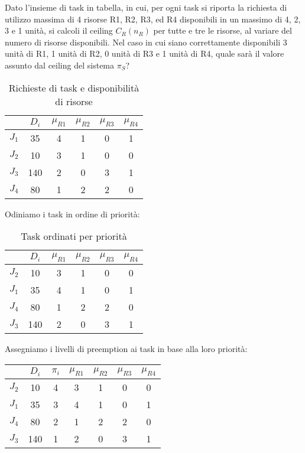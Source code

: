 \begin{Esercizio3}

Dato l'insieme di task in tabella, in cui, 
per ogni task si riporta la richiesta
 di utilizzo massima di 4 risorse R1, R2, R3, ed 
 R4 disponibili in un massimo di 4, 2, 3 e 1 unità, 
 si calcoli il ceiling \(C_{R}(n_{R})\) per tutte e tre le risorse, 
 al variare del numero di risorse disponibili. 
 Nel caso in cui siano correttamente disponibili 3
  unità di R1, 1 unità di R2, 0 unità di R3 e 1 
  unità di R4, quale sarà il valore assunto dal 
  ceiling del sistema \(\pi_{S}\)?

  \begin{table}[H]
\centering
\begin{tabular}{|c|c|c|c|c|c|}
\hline
& $D_i$ & $\mu_{R1}$ & $\mu_{R2}$ & $\mu_{R3}$ & $\mu_{R4}$ \\
\hline
$J_1$ & 35 & 4 & 1 & 0 & 1 \\
\hline
$J_2$ & 10 & 3 & 1 & 0 & 0 \\
\hline
$J_3$ & 140 & 2 & 0 & 3 & 1 \\
\hline
$J_4$ & 80 & 1 & 2 & 2 & 0 \\
\hline
\end{tabular}
\caption{Richieste di task e disponibilità di risorse}
\end{table}

Odiniamo i task in ordine di priorità:

  \begin{table}[H]
\centering
\begin{tabular}{|c|c|c|c|c|c|}
\hline
& $D_i$ & $\mu_{R1}$ & $\mu_{R2}$ & $\mu_{R3}$ & $\mu_{R4}$ \\
\hline
$J_2$ & 10 & 3 & 1 & 0 & 0 \\
\hline
$J_1$ & 35 & 4 & 1 & 0 & 1 \\
\hline
$J_4$ & 80 & 1 & 2 & 2 & 0 \\
\hline
$J_3$ & 140 & 2 & 0 & 3 & 1 \\

\hline
\end{tabular}
\caption{Task ordinati per priorità}
\end{table}


Assegniamo i livelli di preemption ai task in base alla loro priorità:

\begin{table}[H]
\centering
\begin{tabular}{|c|c|c|c|c|c|c|}
\hline
& $D_i$ & \(\pi_{i}\) & $\mu_{R1}$ & $\mu_{R2}$ & $\mu_{R3}$ & $\mu_{R4}$ \\
\hline
$J_2$ & 10 & 4 & 3 & 1 & 0 & 0 \\
\hline
$J_1$ & 35 & 3 & 4 & 1 & 0 & 1 \\
\hline
$J_4$ & 80 & 2 & 1 & 2 & 2 & 0 \\
\hline
$J_3$ & 140 & 1 & 2 & 0 & 3 & 1 \\


\end{tabular}
\end{table}
\end{Esercizio3}
